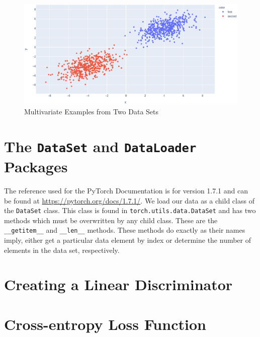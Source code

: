 \documentclass[12pt,letterpaper]{article}
\newcommand{\dunder}[1]{\texttt{\_\_#1\_\_}}
\begin{document}
\begin{figure}[htpb]
	\begin{center}
		\includegraphics[width=.9\textwidth]{images/data.eps}
	\end{center}
	\caption{Multivariate Examples from Two Data Sets}
	\label{fig:data}
\end{figure}

\section{The \texttt{DataSet} and \texttt{DataLoader} Packages}

The reference used for the PyTorch Documentation is for version 1.7.1 and can be found at \href{https://pytorch.org/docs/1.7.1/}{https://pytorch.org/docs/1.7.1/}.
We load our data as a child class of the \texttt{DataSet} class.  
This class is found in \texttt{torch.utils.data.DataSet} and has two methods which must be overwritten by any child class.  
These are the \dunder{getitem} and \dunder{len} methods. 
These methods do exactly as their names imply, either get a particular data element by index or determine the number of elements in the data set, respectively.

\section{Creating a Linear Discriminator}

\section{Cross-entropy Loss Function}
\cite{wiki:crossentropy}






\end{document}
